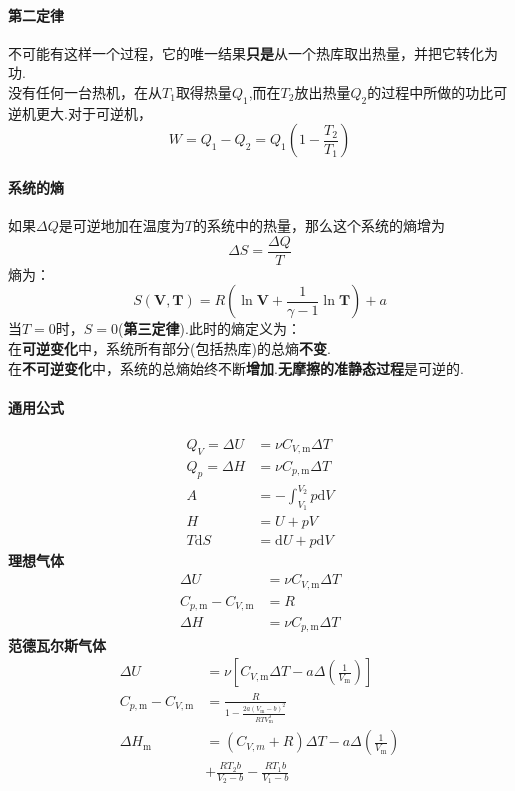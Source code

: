 \documentclass[10pt]{article}
\numberwithin{equation}{section}
\begin{document}
\begin{multicols}{3}
\begin{CJK}{UTF8}{song}
\paragraph{第二定律}  不可能有这样一个过程，它的唯一结果\textbf{只是}从一个热库取出热量，并把它转化为功.\\
没有任何一台热机，在从$T_1$取得热量$Q_1$,而在$T_2$放出热量$Q_2$的过程中所做的功比可逆机更大.对于可逆机，
\begin{equation}
  W=Q_1-Q_2=Q_1\left(1-\frac{T_2}{T_1}\right)
\end{equation}
\paragraph{系统的熵}

如果$\Delta Q$是可逆地加在温度为$T$的系统中的热量，那么这个系统的熵增为
  \begin{equation}
  \Delta S=\frac{\Delta Q}{T}
  \end{equation}
  熵为：
  \begin{equation}
    S(\bm{V},\bm{T})=R\left(\ln \bm{V}+\frac{1}{\gamma-1}\ln \bm{T} \right)+a
  \end{equation}
  当$T=0$时，$S=0$(\textbf{第三定律}).此时的熵定义为：\\
  在\textbf{可逆变化}中，系统所有部分(包括热库)的总熵\textbf{不变}.\\
  在\textbf{不可逆变化}中，系统的总熵始终不断\textbf{增加}.\textbf{无摩擦的准静态过程}是可逆的.

\paragraph{通用公式}
\begin{align}
  Q_V=\Delta U&=\nu C_{V,\textrm{m}}\Delta T\\
  Q_p=\Delta H&=\nu C_{p,\textrm{m}}\Delta T \\
  A&=-\int_{V_1}^{V_2}p\textrm{d}V \\
  H& =U+pV \\
  T\textrm{d}S&=\textrm{d}U+p\textrm{d}V
\end{align}
\textbf{理想气体}
  \begin{align}
  \Delta U&=\nu C_{V,\textrm{m}}\Delta T \\
  C_{p,\textrm{m}}-C_{V,\textrm{m}}&=R \\
  \Delta H &= \nu C_{p,\textrm{m}}\Delta T
  \end{align}
\textbf{范德瓦尔斯气体}
  \begin{align}
  \Delta U&= \nu \left[ C_{V,\textrm{m}}\Delta T-a\Delta \left( \frac{1}{V_{\textrm{m}}} \right) \right]\\
  C_{p,\textrm{m}}-C_{V,\textrm{m}}&=\frac{R}{1-\frac{2a(V_{\textrm{m}}-b)^2}{RTV_{\textrm{m}}^3}}\\
  \Delta H_{\textrm{m}} &= (C_{V,m\textrm{}}+R)\Delta T -a \Delta \left( \frac{1}{V_{\textrm{m}}} \right)\nonumber \\&+\frac{RT_2b}{V_2-b}-\frac{RT_1b}{V_1-b}
  \end{align}


\end{CJK}
\end{multicols}
\end{document}
